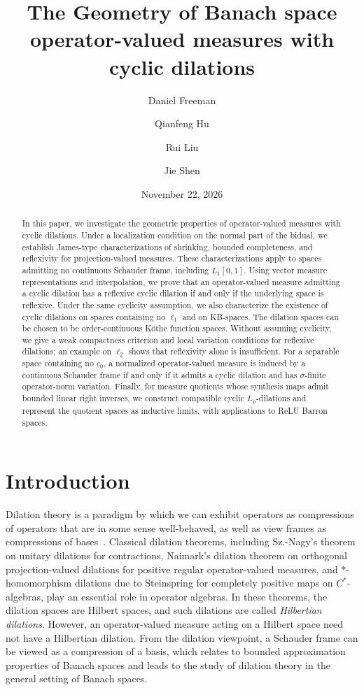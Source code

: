 \documentclass[11pt,leqno]{amsart}
\title[The Geometry of Banach space OVMs with cyclic dilations]{The Geometry of Banach space operator-valued measures with cyclic dilations}
\date{November 22, 2026}
\author{Daniel Freeman}
\author{Qianfeng Hu}
\author{Rui Liu}
\author{Jie Shen}
\theoremstyle{compact}
\numberwithin{equation}{section}
\theoremstyle{compactremark}
\theoremstyle{compact}
\newcommand{\1}{\mathbbm{1}}
\newcommand{\mnote}[2][0pt]{%
    \marginnote{%
        \parbox[t]{1.8cm}{%
            \raggedright\tiny #2%
        }%
    }[#1]%
}
\begin{document}
\begin{abstract}
In this paper, we investigate the geometric properties of operator-valued measures with cyclic dilations. Under a localization condition on the normal part of the bidual, we establish James-type characterizations of shrinking, bounded completeness, and reflexivity for projection-valued measures. 
These characterizations apply to spaces admitting no continuous Schauder frame, including $L_1[0,1]$. Using vector measure representations and interpolation, we prove that an operator-valued measure admitting a cyclic dilation has a reflexive cyclic dilation if and only if the underlying space is reflexive. Under the same cyclicity assumption, we also characterize the existence of cyclic dilations on spaces containing no $\ell_1$ and on KB-spaces. The dilation spaces can be chosen to be order-continuous K\"othe function spaces.
Without assuming cyclicity, we give a weak compactness criterion and local variation conditions for reflexive dilations; an example on $\ell_2$ shows that reflexivity alone is insufficient. For a separable space containing no $c_0$, a normalized operator-valued measure is induced by a continuous Schauder frame if and only if it admits a cyclic dilation and has $\sigma$-finite operator-norm variation. Finally, for measure quotients whose synthesis maps admit bounded linear right inverses, we construct compatible cyclic $L_p$-dilations and represent the quotient spaces as inductive limits, with applications to ReLU Barron spaces.

\end{abstract}

\maketitle

\section{Introduction}
Dilation theory is a paradigm by which we can exhibit operators as compressions of operators that are in some sense well-behaved, as well as view frames as compressions of bases~\cite{Pa2002,HanLarson2000}. Classical dilation theorems, including Sz.-Nagy's theorem on unitary dilations for contractions, Naimark's dilation theorem on orthogonal projection-valued dilations for positive regular operator-valued measures, and  $*$-homomorphism dilations due to Steinspring for completely positive maps on $C^*$-algebras, play an essential role in operator algebras. In these theorems, the dilation spaces are Hilbert spaces, and such dilations are called \textit{Hilbertian dilations}. However, an operator-valued measure acting on a Hilbert space need not have a Hilbertian dilation. From the dilation viewpoint, a Schauder frame can be viewed as a compression of a basis, which relates to bounded approximation properties of Banach spaces \cite{CHL1999} and leads to the study of dilation theory in the general setting of Banach spaces.
\end{document}
